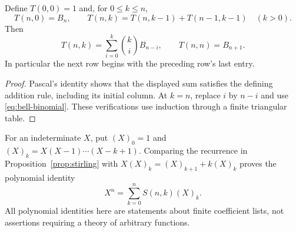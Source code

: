 \begin{proposition}\label{prop:bell-triangle}
Define $T(0,0)=1$ and, for $0\leq k\leq n$,
\[
  T(n,0)=B_n,\qquad
  T(n,k)=T(n,k-1)+T(n-1,k-1)\quad(k>0).
\]
Then
\[
  T(n,k)=\sum_{i=0}^{k}\binom ki B_{n-i},\qquad
  T(n,n)=B_{n+1}.
\]
In particular the next row begins with the preceding row's last entry.
\end{proposition}
\begin{proof}
Pascal's identity shows that the displayed sum satisfies the defining
addition rule, including its initial column. At $k=n$, replace $i$ by $n-i$
and use \eqref{eq:bell-binomial}. These verifications use induction through a
finite triangular table.
\end{proof}

For an indeterminate $X$, put $(X)_0=1$ and
$(X)_k=X(X-1)\cdots(X-k+1)$. Comparing the recurrence in
Proposition~\ref{prop:stirling} with
$X(X)_k=(X)_{k+1}+k(X)_k$ proves the polynomial identity
\begin{equation}\label{eq:power-falling}
 X^n=\sum_{k=0}^{n}S(n,k)(X)_k.
\end{equation}
All polynomial identities here are statements about finite coefficient
lists, not assertions requiring a theory of arbitrary functions.

